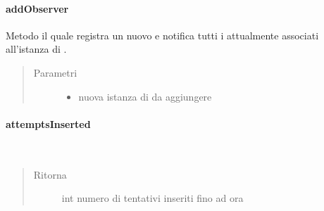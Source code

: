 \documentclass[letterpaper,10pt,italian]{sphinxmanual}
\begin{document}
\paragraph{addObserver}
\label{\detokenize{source/it/unicam/cs/pa/mastermind/gamecore/BoardModel:addobserver}}

\begin{fulllineitems}
\label{\detokenize{source/it/unicam/cs/pa/mastermind/gamecore/BoardModel:it.unicam.cs.pa.mastermind.gamecore.BoardModel.addObserver(BoardObserver)}}
Metodo il quale registra un nuovo  e notifica tutti i  attualmente associati all’istanza di .
\begin{quote}\begin{description}
\item[{Parametri}] \leavevmode\begin{itemize}
\item {} 
 \textendash{} nuova istanza di  da aggiungere

\end{itemize}

\end{description}\end{quote}

\end{fulllineitems}



\paragraph{attemptsInserted}
\label{\detokenize{source/it/unicam/cs/pa/mastermind/gamecore/BoardModel:attemptsinserted}}

\begin{fulllineitems}
\label{\detokenize{source/it/unicam/cs/pa/mastermind/gamecore/BoardModel:it.unicam.cs.pa.mastermind.gamecore.BoardModel.attemptsInserted()}}~\begin{quote}\begin{description}
\item[{Ritorna}] \leavevmode
int numero di tentativi inseriti fino ad ora

\end{description}\end{quote}

\end{fulllineitems}
\end{document}

